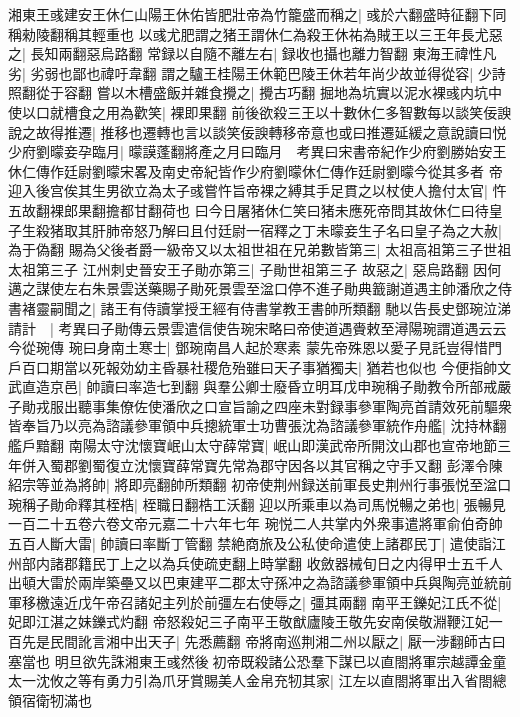 湘東王彧建安王休仁山陽王休佑皆肥壯帝為竹籠盛而稱之|{
	彧於六翻盛時征翻下同稱勑陵翻稱其輕重也}
以彧尤肥謂之猪王謂休仁為殺王休祐為賊王以三王年長尤惡之|{
	長知兩翻惡烏路翻}
常録以自隨不離左右|{
	録收也攝也離力智翻}
東海王禕性凡劣|{
	劣弱也鄙也禕吁韋翻}
謂之驢王桂陽王休範巴陵王休若年尚少故並得從容|{
	少詩照翻從于容翻}
嘗以木槽盛飯并雜食攪之|{
	攪古巧翻}
掘地為坑實以泥水裸彧内坑中使以口就槽食之用為歡笑|{
	裸即果翻}
前後欲殺三王以十數休仁多智數每以談笑佞諛說之故得推遷|{
	推移也遷轉也言以談笑佞諛轉移帝意也或曰推遷延緩之意說讀曰悦}
少府劉曚妾孕臨月|{
	曚謨蓬翻將產之月曰臨月　考異曰宋書帝紀作少府劉勝始安王休仁傳作廷尉劉曚宋畧及南史帝紀皆作少府劉曚休仁傳作廷尉劉曚今從其多者}
帝迎入後宫俟其生男欲立為太子彧嘗忤旨帝裸之縛其手足貫之以杖使人擔付太官|{
	忤五故翻裸郎果翻擔都甘翻荷也}
曰今日屠猪休仁笑曰猪未應死帝問其故休仁曰待皇子生殺猪取其肝肺帝怒乃解曰且付廷尉一宿釋之丁未曚妾生子名曰皇子為之大赦|{
	為于偽翻}
賜為父後者爵一級帝又以太祖世祖在兄弟數皆第三|{
	太祖高祖第三子世祖太祖第三子}
江州刺史晉安王子勛亦第三|{
	子勛世祖第三子}
故惡之|{
	惡烏路翻}
因何邁之謀使左右朱景雲送藥賜子勛死景雲至湓口停不進子勛典籖謝道遇主帥潘欣之侍書褚靈嗣聞之|{
	諸王有侍讀掌授王經有侍書掌教王書帥所類翻}
馳以告長史鄧琬泣涕請計　|{
	考異曰子勛傳云景雲遣信使告琬宋略曰帝使道遇賫敕至潯陽琬謂道遇云云今從琬傳}
琬曰身南土寒士|{
	鄧琬南昌人起於寒素}
蒙先帝殊恩以愛子見託豈得惜門戶百口期當以死報効幼主昏暴社稷危殆雖曰天子事猶獨夫|{
	猶若也似也}
今便指帥文武直造京邑|{
	帥讀曰率造七到翻}
與羣公卿士廢昏立明耳戊申琬稱子勛教令所部戒嚴子勛戎服出聽事集僚佐使潘欣之口宣旨諭之四座未對録事參軍陶亮首請效死前驅衆皆奉旨乃以亮為諮議參軍領中兵摠統軍士功曹張沈為諮議參軍統作舟艦|{
	沈持林翻艦戶黯翻}
南陽太守沈懷寶岷山太守薛常寶|{
	岷山即漢武帝所開汶山郡也宣帝地節三年併入蜀郡劉蜀復立沈懷寶薛常寶先常為郡守因各以其官稱之守手又翻}
彭澤令陳紹宗等並為將帥|{
	將即亮翻帥所類翻}
初帝使荆州録送前軍長史荆州行事張悦至湓口琬稱子勛命釋其桎梏|{
	桎職日翻梏工沃翻}
迎以所乘車以為司馬悦暢之弟也|{
	張暢見一百二十五卷六卷文帝元嘉二十六年七年}
琬悦二人共掌内外衆事遣將軍俞伯奇帥五百人斷大雷|{
	帥讀曰率斷丁管翻}
禁絶商旅及公私使命遣使上諸郡民丁|{
	遣使詣江州部内諸郡籍民丁上之以為兵使疏吏翻上時掌翻}
收斂器械旬日之内得甲士五千人出頓大雷於兩岸築壘又以巴東建平二郡太守孫冲之為諮議參軍領中兵與陶亮並統前軍移檄遠近戊午帝召諸妃主列於前彊左右使辱之|{
	彊其兩翻}
南平王鑠妃江氏不從|{
	妃即江湛之妹鑠式灼翻}
帝怒殺妃三子南平王敬猷廬陵王敬先安南侯敬淵鞭江妃一百先是民間訛言湘中出天子|{
	先悉薦翻}
帝將南巡荆湘二州以厭之|{
	厭一涉翻師古曰塞當也}
明旦欲先誅湘東王彧然後初帝既殺諸公恐羣下謀已以直閤將軍宗越譚金童太一沈攸之等有勇力引為爪牙賞賜美人金帛充牣其家|{
	江左以直閤將軍出入省閤總領宿衛牣滿也}
